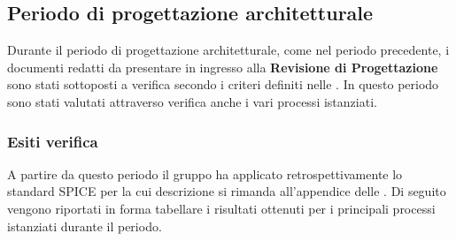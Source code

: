 \subsection{Periodo di progettazione architetturale} \label{ResocontoPArchitetturale}
Durante il periodo di progettazione architetturale, come nel periodo precedente, i documenti redatti da presentare in ingresso alla \textbf{Revisione di Progettazione} sono stati sottoposti a verifica secondo i criteri definiti nelle . In questo periodo sono stati valutati attraverso verifica anche i vari processi istanziati.
\subsubsection{Esiti verifica}
A partire da questo periodo il gruppo ha applicato retrospettivamente lo standard SPICE per la cui descrizione si rimanda all'appendice delle . Di seguito vengono riportati in forma tabellare i risultati ottenuti per i principali processi istanziati durante il periodo. 
